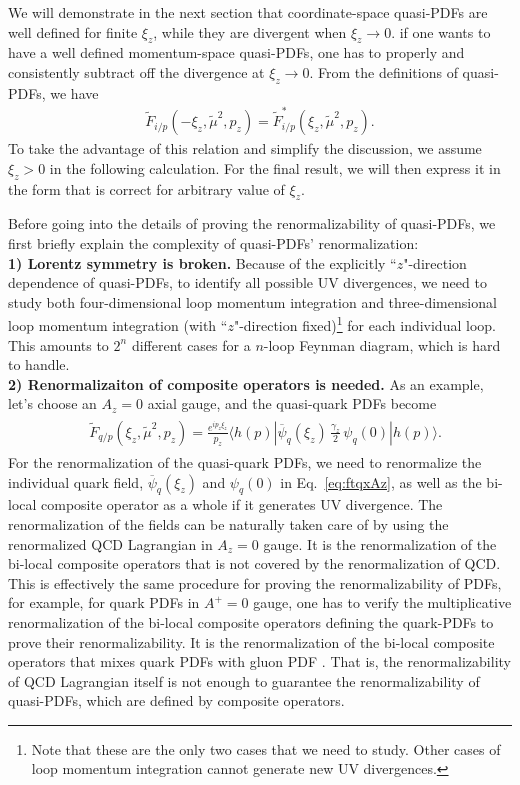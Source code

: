 \documentclass[twocolumn,aps,prd,superscriptaddress,nofootinbib,showpacs]{revtex4}
\begin{document}
We will demonstrate in the next section that coordinate-space quasi-PDFs are well defined for finite $\xi_z$, while they are divergent when $\xi_z\to0$.  if one wants to have a well defined momentum-space quasi-PDFs, one has to properly and consistently subtract off the divergence at $\xi_z\to0$.  From the definitions of quasi-PDFs, we have
\begin{align}
\tilde{F}_{i/p}(-\xi_z,\tilde{\mu}^2,p_z)=\tilde{F}_{i/p}^*(\xi_z,\tilde{\mu}^2,p_z).
\end{align}
To take the advantage of this relation and simplify the discussion, we assume $\xi_z>0$ in the following calculation.  For the final result, we will then express it in the form that is correct for arbitrary value of $\xi_z$.

Before going into the details of proving the renormalizability of quasi-PDFs, we first briefly explain the complexity of quasi-PDFs' renormalization:\\
{\bf 1) Lorentz symmetry is broken.} Because of the explicitly ``$z$"-direction dependence of quasi-PDFs, to identify all possible UV divergences, we need to study both four-dimensional loop momentum integration and three-dimensional loop momentum integration (with ``$z$"-direction fixed)\footnote{Note that these are the only two cases that we need to study. Other cases of loop momentum integration cannot generate new UV divergences.} for each individual loop. This amounts to $2^n$ different cases for a $n$-loop Feynman diagram, which is hard to handle.\\
{\bf 2) Renormalizaiton of composite operators is needed.} As an example, let's choose an $A_z=0$ axial gauge, and the quasi-quark PDFs become
\begin{align}\label{eq:ftqxAz}
\begin{split}
&\tilde{F}_{q/p}(\xi_z,\tilde{\mu}^2,p_z)= \frac{e^{i p_z \xi_z}}{p_z} \left. \langle h(p)| \overline{\psi}_q(\xi_z)\,\frac{\gamma_z}{2}\, \psi_q(0) | h(p) \rangle\right. .
\end{split}
\end{align}
For the renormalization of the quasi-quark PDFs, we need to renormalize the individual quark field, $\overline{\psi}_q(\xi_z)$ and $\psi_q(0)$ in Eq.~\eqref{eq:ftqxAz}, as well as the bi-local composite operator as a whole if it generates UV divergence.  The renormalization of the fields can be naturally taken care of by using the renormalized QCD Lagrangian in $A_z=0$ gauge.  It is the renormalization of the bi-local composite operators that is not covered by the renormalization of QCD.  This is effectively the same procedure for proving the renormalizability of PDFs, for example, for quark PDFs in $A^+=0$ gauge, one has to verify the multiplicative renormalization of the bi-local composite operators defining the quark-PDFs to prove their renormalizability.  It is the renormalization of the bi-local composite operators that mixes quark PDFs with gluon PDF \cite{Collins:1981uw}.  That is, the renormalizability of QCD Lagrangian itself is not enough to guarantee the renormalizability of quasi-PDFs, which are defined by composite operators.
\end{document}
